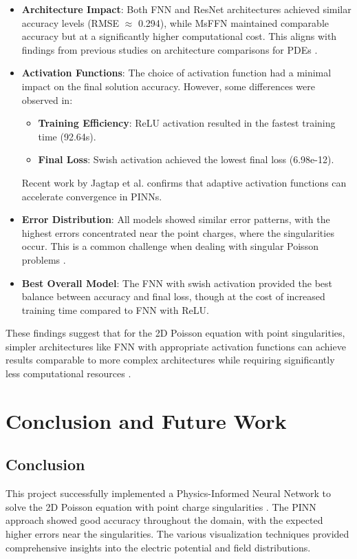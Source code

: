 \documentclass[12pt,a4paper]{report}
\begin{document}
	\begin{itemize}
		\item \textbf{Architecture Impact}: Both FNN and ResNet architectures achieved similar accuracy levels (RMSE $\approx$ 0.294), while MsFFN maintained comparable accuracy but at a significantly higher computational cost. This aligns with findings from previous studies on architecture comparisons for PDEs \cite{chen2020comparison}.
		
		\item \textbf{Activation Functions}: The choice of activation function had a minimal impact on the final solution accuracy. However, some differences were observed in:
		\begin{itemize}
			\item \textbf{Training Efficiency}: ReLU activation resulted in the fastest training time (92.64s).
			\item \textbf{Final Loss}: Swish activation achieved the lowest final loss (6.98e-12).
		\end{itemize}
		Recent work by Jagtap et al. \cite{jagtap2020adaptive} confirms that adaptive activation functions can accelerate convergence in PINNs.
		
		\item \textbf{Error Distribution}: All models showed similar error patterns, with the highest errors concentrated near the point charges, where the singularities occur. This is a common challenge when dealing with singular Poisson problems \cite{huang2022solving}.
		
		\item \textbf{Best Overall Model}: The FNN with swish activation provided the best balance between accuracy and final loss, though at the cost of increased training time compared to FNN with ReLU.
	\end{itemize}
	
	These findings suggest that for the 2D Poisson equation with point singularities, simpler architectures like FNN with appropriate activation functions can achieve results comparable to more complex architectures while requiring significantly less computational resources \cite{wang2021understanding}. 
	\chapter{Conclusion and Future Work}
	
	\section{Conclusion}
	This project successfully implemented a Physics-Informed Neural Network to solve the 2D Poisson equation with point charge singularities \cite{huang2022solving}. The PINN approach showed good accuracy throughout the domain, with the expected higher errors near the singularities. The various visualization techniques provided comprehensive insights into the electric potential and field distributions.
	
\end{document}
